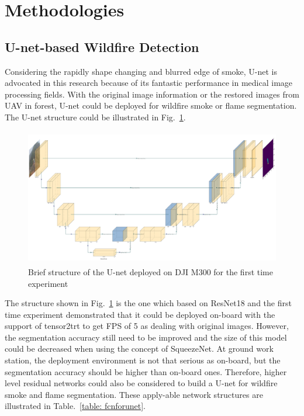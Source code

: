 \section{Methodologies}
\subsection{U-net-based Wildfire Detection}
Considering the rapidly shape changing and blurred edge of smoke, U-net is advocated in this research because of its fantastic performance in medical image processing fields. With the original image information or the restored images from UAV in forest, U-net could be deployed for wildfire smoke or flame segmentation. The U-net structure could be illustrated in Fig.~\ref{fig:figureUnetmodel}.
\begin{figure}[ht]
    \centering
    \includegraphics[height=60mm]{figs/figureUnetmodel.png}
    \caption{Brief structure of the U-net deployed on DJI M300 for the first time experiment}
    \label{fig:figureUnetmodel}
\end{figure}\par
The structure shown in Fig.~\ref{fig:figureUnetmodel} is the one which based on ResNet18 and the first time experiment demonstrated that it could be deployed on-board with the support of tensor2trt to get FPS of 5 as dealing with original images. However, the segmentation accuracy still need to be improved and the size of this model could be decreased when using the concept of SqueezeNet. At ground work station, the deployment environment is not that serious as on-board, but the segmentation accuracy should be higher than on-board ones. Therefore, higher level residual networks could also be considered to build a U-net for wildfire smoke and flame segmentation. These apply-able network structures are illustrated in Table.~\ref{table: fcnforunet}.
